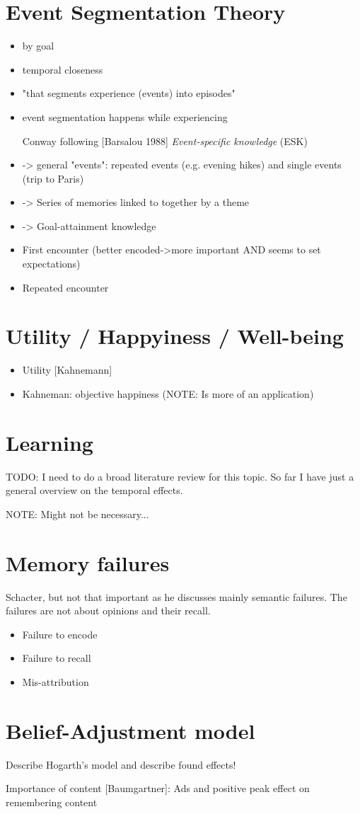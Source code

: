\section{Event Segmentation Theory}
\cite{black_episodes_1979}\cite{ezzyat_what_2011}\cite{zacks_perceiving_2001}
\begin{itemize}
\item by goal \cite{black_episodes_1979}
\item temporal closeness \cite{black_episodes_1979}\cite{ezzyat_what_2011}
\item "that segments experience (events) into episodes" \cite[248]{ezzyat_what_2011}
\item event segmentation happens while experiencing \cite[248]{ezzyat_what_2011}

\item [Conway] following [Barsalou 1988] \textit{Event-specific knowledge} (ESK)
\item -> general "events": repeated events (e.g. evening hikes) and single events (trip to Paris)
\item -> Series of memories linked to together by a theme
\item -> Goal-attainment knowledge
\item First encounter (better encoded->more important AND seems to set expectations)
\item Repeated encounter
\end{itemize}

\section{Utility / Happyiness / Well-being}
\begin{itemize}
\item Utility [Kahnemann]
\item Kahneman: objective happiness (NOTE: Is more of an application)
\end{itemize}

\section{Learning}
TODO: I need to do a broad literature review for this topic.
So far I have just a general overview on the temporal effects.

NOTE: Might not be necessary...

\section{Memory failures}
Schacter, but not that important as he discusses mainly semantic failures.
The failures are not about opinions and their recall.

\begin{itemize}
\item Failure to encode
\item Failure to recall
\item Mis-attribution
\end{itemize}


\section{Belief-Adjustment model}
Describe Hogarth's model and describe found effects!

Importance of content [Baumgartner]: Ads and positive peak effect on remembering content
